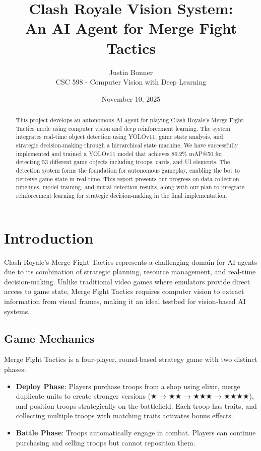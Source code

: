\documentclass[12pt]{article}
\title{Clash Royale Vision System: \\
An AI Agent for Merge Fight Tactics}
\author{Justin Bonner \\ CSC 598 - Computer Vision with Deep Learning}
\date{November 10, 2025}
\begin{document}
\maketitle

\begin{abstract}
This project develops an autonomous AI agent for playing Clash Royale's Merge Fight Tactics mode using computer vision and deep reinforcement learning. The system integrates real-time object detection using YOLOv11, game state analysis, and strategic decision-making through a hierarchical state machine. We have successfully implemented and trained a YOLOv11 model that achieves 86.2\% mAP@50 for detecting 53 different game objects including troops, cards, and UI elements. The detection system forms the foundation for autonomous gameplay, enabling the bot to perceive game state in real-time. This report presents our progress on data collection pipelines, model training, and initial detection results, along with our plan to integrate reinforcement learning for strategic decision-making in the final implementation.
\end{abstract}

\section{Introduction}

Clash Royale's Merge Fight Tactics represents a challenging domain for AI agents due to its combination of strategic planning, resource management, and real-time decision-making. Unlike traditional video games where emulators provide direct access to game state, Merge Fight Tactics requires computer vision to extract information from visual frames, making it an ideal testbed for vision-based AI systems.

\subsection{Game Mechanics}

Merge Fight Tactics is a four-player, round-based strategy game with two distinct phases:

\begin{itemize}
    \item \textbf{Deploy Phase}: Players purchase troops from a shop using elixir, merge duplicate units to create stronger versions (★ → ★★ → ★★★ → ★★★★), and position troops strategically on the battlefield. Each troop has traits, and collecting multiple troops with matching traits activates bonus effects.

    \item \textbf{Battle Phase}: Troops automatically engage in combat. Players can continue purchasing and selling troops but cannot reposition them.
\end{itemize}
\end{document}
